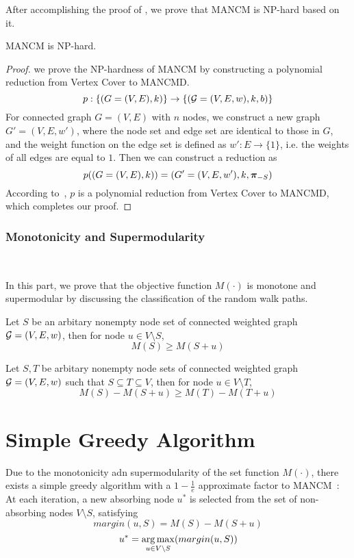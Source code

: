 \documentclass[sigconf]{acmart}
\begin{document}
After accomplishing the proof of , we prove that MANCM is NP-hard based on it.
\begin{theorem}\label{thm:np-hard}
    MANCM is NP-hard.
\end{theorem}
\begin{proof}
    we prove the NP-hardness of MANCM by constructing a polynomial reduction from Vertex Cover to MANCMD.
    \[p:\{(G=(V,E),k)\}\to\{(\mathcal{G}=(V,E,w),k,b)\}\]
    For connected graph \(G=(V,E)\) with \(n\) nodes, we construct a new graph \(G'=(V,E,w')\), where the node set and edge set are identical to those in \(G\), and the weight function on the edge set is defined as \(w':E\to\{1\}\), i.e. the weights of all edges are equal to \(1\). Then we can construct a reduction as
    \[p((G=(V,E),k))=(G'=(V,E,w'),k,\boldsymbol{\pi}_{-S})\]
    According to~, \(p\) is a polynomial reduction from Vertex Cover to MANCMD, which completes our proof.
\end{proof}

\subsubsection{Monotonicity and Supermodularity}

\

In this part, we prove that the objective function \(M(\cdot)\) is monotone and supermodular by discussing the classification of the random walk paths.
\begin{theorem}[Monotonicity]\label{thm:mono}
    Let \(S\) be an arbitary nonempty node set of connected weighted graph \(\mathcal{G}=(V,E,w)\), then for node \(u\in V\setminus S\),
    \[M(S)\ge M(S+u)\]
\end{theorem}
\begin{theorem}[Supermodularity]\label{thm:supermod}
    Let \(S,T\) be arbitary nonempty node sets of connected weighted graph \(\mathcal{G}=(V,E,w)\) such that \(S\subseteq T\subseteq V\), then for node \(u\in V\setminus T\),
    \[M(S)-M(S+u)\ge M(T)-M(T+u)\]
\end{theorem}

\section{Simple Greedy Algorithm}

Due to the monotonicity adn supermodularity of the set function \(M(\cdot)\), there exists a simple greedy algorithm with a \(1-\frac1e\) approximate factor to MANCM~\cite{NeWoFi78}:
At each iteration, a new absorbing node \(u^*\) is selected from the set of non-absorbing nodes \(V\setminus S\), satisfying
\[margin(u,S)=M(S)-M(S+u)\]
\[u^*=\operatorname*{arg\,max}_{u\in V\setminus S}(margin(u,S))\]
\end{document}
